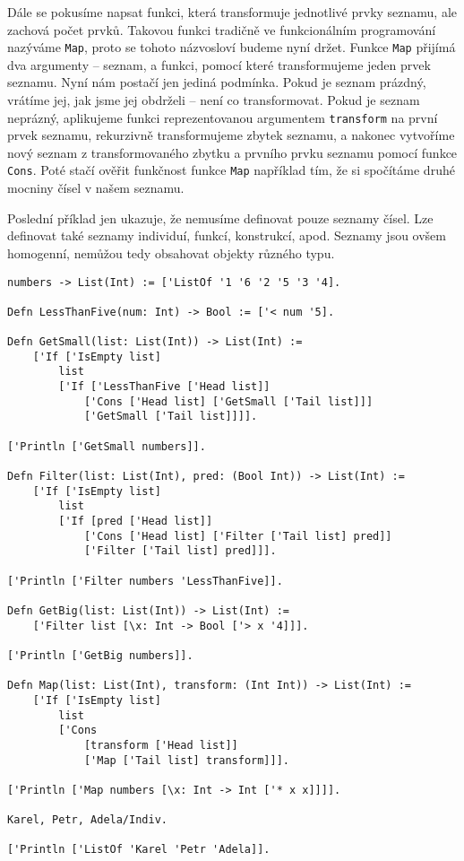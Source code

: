 Dále se pokusíme napsat funkci, která transformuje jednotlivé prvky seznamu, ale zachová počet
prvků. Takovou funkci tradičně ve funkcionálním programování nazýváme \lstinline{Map}, proto se
tohoto názvosloví budeme nyní držet. Funkce \lstinline{Map} přijímá dva argumenty -- seznam, a
funkci, pomocí které transformujeme jeden prvek seznamu. Nyní nám postačí jen jediná podmínka.
Pokud je seznam prázdný, vrátíme jej, jak jsme jej obdrželi -- není co transformovat. Pokud je seznam
neprázný, aplikujeme funkci reprezentovanou argumentem \lstinline{transform} na první prvek
seznamu, rekurzivně transformujeme zbytek seznamu, a nakonec vytvoříme nový seznam
z transformovaného zbytku a prvního prvku seznamu pomocí funkce \lstinline{Cons}. Poté stačí ověřit
funkčnost funkce \lstinline{Map} například tím, že si spočítáme druhé mocniny čísel v našem seznamu.

Poslední příklad jen ukazuje, že nemusíme definovat pouze seznamy čísel. Lze definovat také seznamy
individuí, funkcí, konstrukcí, apod. Seznamy jsou ovšem homogenní, nemůžou tedy obsahovat objekty
různého typu.

\begin{lstlisting}[caption={Funkce a uzávěry}, language=Tilscript]
numbers -> List(Int) := ['ListOf '1 '6 '2 '5 '3 '4].

Defn LessThanFive(num: Int) -> Bool := ['< num '5].

Defn GetSmall(list: List(Int)) -> List(Int) :=
    ['If ['IsEmpty list]
        list
        ['If ['LessThanFive ['Head list]]
            ['Cons ['Head list] ['GetSmall ['Tail list]]]
            ['GetSmall ['Tail list]]]].

['Println ['GetSmall numbers]].

Defn Filter(list: List(Int), pred: (Bool Int)) -> List(Int) :=
    ['If ['IsEmpty list]
        list
        ['If [pred ['Head list]]
            ['Cons ['Head list] ['Filter ['Tail list] pred]]
            ['Filter ['Tail list] pred]]].

['Println ['Filter numbers 'LessThanFive]].

Defn GetBig(list: List(Int)) -> List(Int) :=
    ['Filter list [\x: Int -> Bool ['> x '4]]].

['Println ['GetBig numbers]].

Defn Map(list: List(Int), transform: (Int Int)) -> List(Int) :=
    ['If ['IsEmpty list]
        list
        ['Cons
            [transform ['Head list]]
            ['Map ['Tail list] transform]]].

['Println ['Map numbers [\x: Int -> Int ['* x x]]]].

Karel, Petr, Adela/Indiv.

['Println ['ListOf 'Karel 'Petr 'Adela]].
\end{lstlisting}

